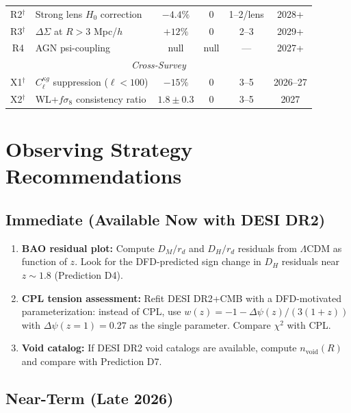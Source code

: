 \documentclass[12pt]{article}
\newcommand{\LCDM}{$\Lambda$CDM}
\begin{document}
\begin{table}[H]
\begin{tabular}{clcccc}
R2$^\dagger$ & Strong lens $H_0$ correction & $-4.4\%$ & 0 & 1--2/lens & 2028+ \\
R3$^\dagger$ & $\Delta\Sigma$ at $R>3$ Mpc/$h$ & $+12\%$ & 0 & 2--3 & 2029+ \\
R4 & AGN psi-coupling & null & null & --- & 2027+ \\
\midrule
\multicolumn{6}{c}{\textit{Cross-Survey}} \\
\midrule
X1$^\dagger$ & $C_\ell^{\kappa g}$ suppression ($\ell<100$) & $-15\%$ & 0 & 3--5 & 2026--27 \\
X2$^\dagger$ & WL+$f\sigma_8$ consistency ratio & $1.8\pm0.3$ & 0 & 3--5 & 2027 \\
\bottomrule
\end{tabular}
\end{table}

\section{Observing Strategy Recommendations}
\label{sec:strategy}

\subsection{Immediate (Available Now with DESI DR2)}

\begin{enumerate}
\item \textbf{BAO residual plot:} Compute $D_M/r_d$ and $D_H/r_d$ residuals from \LCDM{} as function of $z$. Look for the DFD-predicted sign change in $D_H$ residuals near $z \sim 1.8$ (Prediction D4).
\item \textbf{CPL tension assessment:} Refit DESI DR2+CMB with a DFD-motivated parameterization: instead of CPL, use $w(z) = -1 - \Delta\psi(z)/(3(1+z))$ with $\Delta\psi(z=1) = 0.27$ as the single parameter. Compare $\chi^2$ with CPL.
\item \textbf{Void catalog:} If DESI DR2 void catalogs are available, compute $n_\mathrm{void}(R)$ and compare with Prediction D7.
\end{enumerate}

\subsection{Near-Term (Late 2026)}
\end{document}
